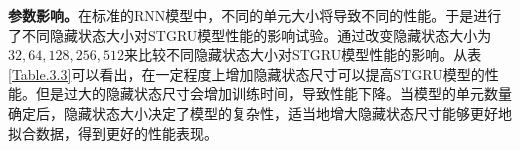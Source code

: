 \documentclass[master]{thesis-uestc}
\begin{document}
\begin{table}[ht]
\centering
\caption{STGRU模型在不同隐藏状态大小下的性能}
\label{Table.3.3}
\end{table}
\textbf{参数影响。}在标准的RNN模型中，不同的单元大小将导致不同的性能。于是进行了不同隐藏状态大小对STGRU模型性能的影响试验。通过改变隐藏状态大小为$32,64,128,256,512$来比较不同隐藏状态大小对STGRU模型性能的影响。从表\ref{Table.3.3}可以看出，在一定程度上增加隐藏状态尺寸可以提高STGRU模型的性能。但是过大的隐藏状态尺寸会增加训练时间，导致性能下降。当模型的单元数量确定后，隐藏状态大小决定了模型的复杂性，适当地增大隐藏状态尺寸能够更好地拟合数据，得到更好的性能表现。
\end{document}
